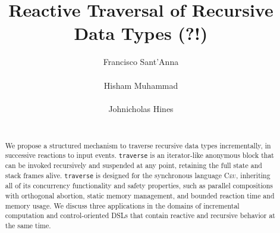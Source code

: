 \documentclass{acm_proc_article-sp}
\newcommand{\CEU}{\textsc{C\'{e}u}\xspace}
\newcommand{\code}[1] {{\small{\texttt{#1}}}}
\begin{document}
\title{Reactive Traversal of Recursive Data Types (?!)}

\author{
\alignauthor
Francisco Sant'Anna \\
     \\
\alignauthor
Hisham Muhammad \\
     \\
\alignauthor
Johnicholas Hines \\
     \\
}

\maketitle
\begin{abstract}
We propose a structured mechanism to traverse recursive data types 
incrementally, in successive reactions to input events.
\code{traverse} is an iterator-like anonymous block that can be invoked 
recursively and suspended at any point, retaining the full state and stack 
frames alive.
\code{traverse} is designed for the synchronous language \CEU, inheriting all 
of its concurrency functionality and safety properties, such as parallel 
compositions with orthogonal abortion, static memory management, and bounded 
reaction time and memory usage.
We discuss three applications in the domains of incremental computation and 
control-oriented DSLs that contain reactive and recursive behavior at the same 
time.

\end{abstract}
\end{document}
